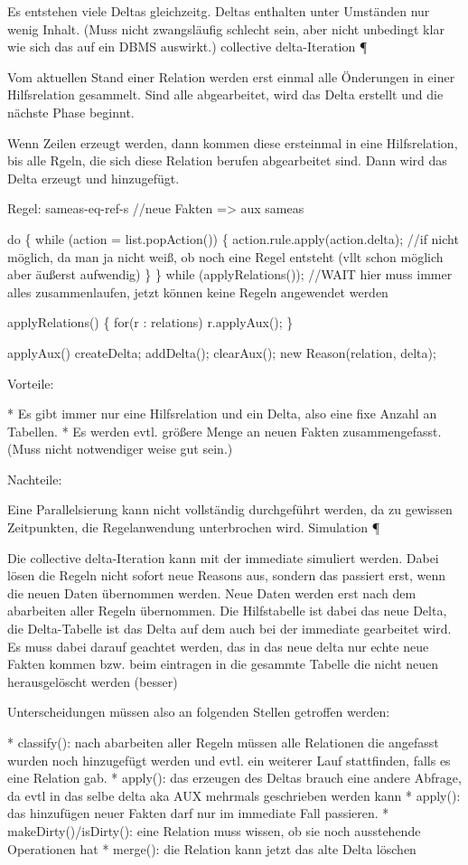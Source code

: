 Es entstehen viele Deltas gleichzeitg. Deltas enthalten unter Umständen nur wenig Inhalt. (Muss nicht zwangsläufig schlecht sein, aber nicht unbedingt klar wie sich das auf ein DBMS auswirkt.)
collective delta-Iteration ¶

Vom aktuellen Stand einer Relation werden erst einmal alle Önderungen in einer Hilfsrelation gesammelt. Sind alle abgearbeitet, wird das Delta erstellt und die nächste Phase beginnt.

Wenn Zeilen erzeugt werden, dann kommen diese ersteinmal in eine Hilfsrelation, bis alle Rgeln, die sich diese Relation berufen abgearbeitet sind. Dann wird das Delta erzeugt und hinzugefügt.

Regel: sameas-eq-ref-s //neue Fakten
=> aux sameas

do \{
  while (action = list.popAction()) \{
    action.rule.apply(action.delta);
    //if nicht möglich, da man ja nicht weiß, ob noch eine Regel entsteht (vllt schon möglich aber äußerst aufwendig)
  \}
\}
while (applyRelations()); //WAIT hier muss immer alles zusammenlaufen, jetzt können keine Regeln angewendet werden

applyRelations() \{
  for(r : relations)
    r.applyAux();
\}

applyAux() {
  createDelta;
  addDelta();
  clearAux();
  new Reason(relation, delta);
}

Vorteile:

    * Es gibt immer nur eine Hilfsrelation und ein Delta, also eine fixe Anzahl an Tabellen.
    * Es werden evtl. größere Menge an neuen Fakten zusammengefasst. (Muss nicht notwendiger weise gut sein.) 

Nachteile:

Eine Parallelsierung kann nicht vollständig durchgeführt werden, da zu gewissen Zeitpunkten, die Regelanwendung unterbrochen wird.
Simulation ¶

Die collective delta-Iteration kann mit der immediate simuliert werden. Dabei lösen die Regeln nicht sofort neue Reasons aus, sondern das passiert erst, wenn die neuen Daten übernommen werden. Neue Daten werden erst nach dem abarbeiten aller Regeln übernommen. Die Hilfstabelle ist dabei das neue Delta, die Delta-Tabelle ist das Delta auf dem auch bei der immediate gearbeitet wird. Es muss dabei darauf geachtet werden, das in das neue delta nur echte neue Fakten kommen bzw. beim eintragen in die gesammte Tabelle die nicht neuen herausgelöscht werden (besser)

Unterscheidungen müssen also an folgenden Stellen getroffen werden:

    * classify(): nach abarbeiten aller Regeln müssen alle Relationen die angefasst wurden noch hinzugefügt werden und evtl. ein weiterer Lauf stattfinden, falls es eine Relation gab.
    * apply(): das erzeugen des Deltas brauch eine andere Abfrage, da evtl in das selbe delta aka AUX mehrmals geschrieben werden kann
    * apply(): das hinzufügen neuer Fakten darf nur im immediate Fall passieren.
    * makeDirty()/isDirty(): eine Relation muss wissen, ob sie noch ausstehende Operationen hat
    * merge(): die Relation kann jetzt das alte Delta löschen 

